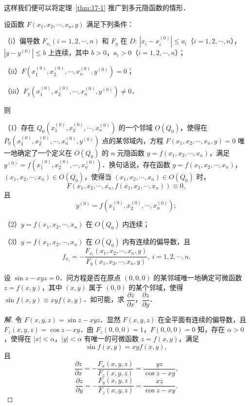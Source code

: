 这样我们便可以将定理~\ref{thm:17-1} 推广到多元隐函数的情形．

\begin{theorem}\label{thm:17-2}
设函数 $F(x_{1},x_{2},\cdots,x_{n},y)$ 满足下列条件：

（i）偏导数 $F_{x_{i}}(i=1,2,\cdots,n)$ 和 $F_{y}$ 在 $D$: $\left|x_{i}-x_{i}^{(0)}\right|\leqslant a_{i}$（$i=1,2,\cdots,n$），$\left|y-y^{(0)}\right|\leqslant b$ 上连续，其中 $b>0$，$a_{i}>0$（$i=1,2,\cdots,n$）；

（ii）$F(x_{1}^{(0)},x_{2}^{(0)},\cdots,x_{n}^{(0)},y^{(0)})=0$；

（iii）$F_{y}(x_{1}^{(0)},x_{2}^{(0)},\cdots,x_{n}^{(0)},y^{(0)})\neq0$．

则

（1）存在 $Q_{0}(x_{1}^{(0)},x_{2}^{(0)},\cdots,x_{n}^{(0)})$ 的一个邻域 $O(Q_{0})$，使得在 $P_{0}(x_{1}^{(0)},x_{2}^{(0)},\cdots,x_{n}^{(0)},y^{(0)})$ 点的某邻域内，方程 $F(x_{1},x_{2},\cdots,x_{n},y)=0$ 唯一地确定了一个定义在 $O(Q_{0})$ 的 $n$ 元隐函数 $y=f(x_{1},x_{2},\cdots,x_{n})$，满足 $y^{(0)}=f(x_{1}^{(0)},x_{2}^{(0)},\cdots,x_{n}^{(0)})$．换句话说，存在函数 $y=f(x_{1},x_{2},\cdots,x_{n})$，$(x_{1},x_{2},\cdots,x_{n})\in O(Q_{0})$，使得当 $(x_{1},x_{2},\cdots,x_{n})\in O(Q_{0})$ 时，
\[
F(x_{1},x_{2},\cdots,x_{n},f(x_{1},x_{2},\cdots,x_{n}))\equiv0,
\]
且
\[
y^{(0)}=f(x_{1}^{(0)},x_{2}^{(0)},\cdots,x_{n}^{(0)});
\]

（2）$y=f(x_{1},x_{2},\cdots,x_{n})$ 在 $O(Q_{0})$ 内连续；

（3）$y=f(x_{1},x_{2},\cdots,x_{n})$ 在 $O(Q_{0})$ 内有连续的偏导数，且
\[
f_{x_{i}}=-\frac{F_{x_{i}}(x_{1},x_{2},\cdots,x_{n},y)}{F_{y}(x_{1},x_{2},\cdots,x_{n},y)},\ i=1,2,\cdots,n.
\]
\end{theorem}

\begin{example}\label{ex:17-1-3}
设 $\sin z-xyz=0$．问方程是否在原点 $(0,0,0)$ 的某邻域唯一地确定可微函数 $z=f(x,y)$，其中 $(x,y)$ 属于 $(0,0)$ 的某个邻域，使得 $\sin f(x,y)\equiv xyf(x,y)$．如可能，求 $\dfrac{\partial z}{\partial x}$，$\dfrac{\partial z}{\partial y}$．
\end{example}

\begin{proof}[解]
令 $F(x,y,z)=\sin z-xyz$．显然 $F(x,y,z)$ 在全平面有连续的偏导数，且 $F_{z}(x,y,z)=\cos z-xy$．由 $F_{z}(0,0,0)=1$，$F(0,0,0)=0$ 知，存在 $\alpha>0$，使得在 $\left|x\right|<\alpha$，$\left|y\right|<\alpha$ 有唯一的可微函数 $z=f(x,y)$，满足
\[
\sin f(x,y)=xyf(x,y),
\]
且
\[
\frac{\partial z}{\partial x}=-\frac{F_{x}(x,y,z)}{F_{z}(x,y,z)}=\frac{yz}{\cos z-xy},
\]
\[
\frac{\partial z}{\partial y}=-\frac{F_{y}(x,y,z)}{F_{z}(x,y,z)}=\frac{xz}{\cos z-xy}.
\]
\end{proof}

